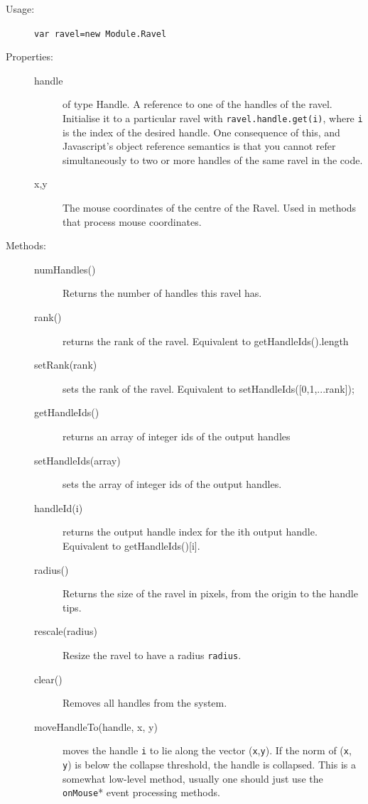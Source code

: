\documentclass{article}
\begin{document}
\begin{description}
\item[Usage:] \verb+var ravel=new Module.Ravel+

\item[Properties:]\mbox{}
\begin{description}
\item[handle] of type Handle. A reference to one of the handles of the
ravel. Initialise it to a particular ravel with
\verb+ravel.handle.get(i)+, where \verb+i+ is the index of the desired
handle. One consequence of this, and Javascript's object reference
semantics is that you cannot refer simultaneously to two or more
handles of the same ravel in the code.
\item[x,y] The mouse coordinates of the centre of the Ravel. Used in
methods that process mouse coordinates.
\end{description}
 
\item[Methods:]\mbox{}
\begin{description}
\item[numHandles()] Returns the number of handles this ravel has.

\item[rank()] returns the rank of the ravel. Equivalent to getHandleIds().length
\item[setRank(rank)] sets the rank of the ravel. Equivalent to
setHandleIds([0,1,...rank]);
\item[getHandleIds()] returns an array of integer ids of the output handles
\item[setHandleIds(array)] sets the array of integer ids of the output
handles.
\item[handleId(i)] returns the output handle index for the ith output
handle. Equivalent to getHandleIds()[i].

\item[radius()] Returns the size of the ravel in pixels, from the origin
to the handle tips.
\item[rescale(radius)] Resize the ravel to have a radius {\tt radius}.

\item[clear()] Removes all handles from the system.

\item[moveHandleTo(handle, x, y)] moves the handle {\tt i} to
lie along the vector ({\tt x},{\tt y}). If the norm of ({\tt x},{\tt
y}) is below the collapse threshold, the handle is collapsed. This is
a somewhat low-level method, usually one should just use the {\tt
onMouse}* event processing methods.


\end{description}
\end{description}
\end{document}
